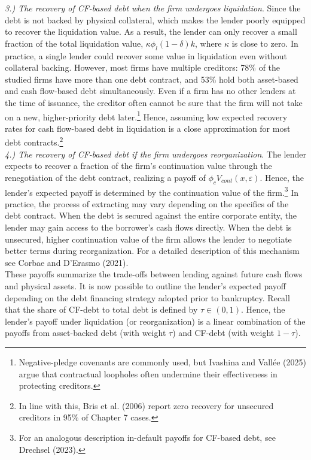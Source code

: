 \documentclass[12pt]{article}
\begin{document}
\textit{ 3.) The recovery of CF-based debt when the firm undergoes liquidation}. Since the debt is not backed by physical collateral, which makes the lender poorly equipped to recover the liquidation value. As a result, the lender can only recover a small fraction of the total liquidation value, $\kappa \phi_l(1-\delta)k$, where $\kappa$ is close to zero. In practice, a single lender could recover some value in liquidation even without collateral backing. However, most firms have multiple creditors: 78\% of the studied firms have more than one debt contract, and 53\% hold both asset-based and cash flow-based debt simultaneously. Even if a firm has no other lenders at the time of issuance, the creditor often cannot be sure that the firm will not take on a new, higher-priority debt later.\footnote{Negative-pledge covenants are commonly used, but Ivashina and Vallée (2025) argue that contractual loopholes often undermine their effectiveness in protecting creditors.} Hence, assuming low expected recovery rates for cash flow-based debt in liquidation is a close approximation for most debt contracts.\footnote{In line with this, Bris et al. (2006) report zero recovery for unsecured creditors in 95\% of Chapter 7 cases.}   \vspace{3mm} \\
\textit{ 4.) The recovery of CF-based debt if the firm undergoes reorganization}. The lender expects to recover a fraction of the firm’s continuation value through the renegotiation of the debt contract, realizing a payoff of $\phi_c V_{cont}(x,\varepsilon)$. Hence, the lender's expected payoff is determined by the continuation value of the firm.\footnote{For an analogous description in-default payoffs for CF-based debt, see Drechsel (2023).} In practice, the process of extracting may vary depending on the specifics of the debt contract. When the debt is secured against the entire corporate entity, the lender may gain access to the borrower's cash flows directly. When the debt is unsecured, higher continuation value of the firm allows the lender to negotiate better terms during reorganization. For a detailed description of this mechanism see Corbae and D'Erasmo (2021). \vspace{3mm} \\
These payoffs summarize the trade-offs between lending against future cash flows and physical assets. It is now possible to outline the lender's expected payoff depending on the debt financing strategy adopted prior to bankruptcy. Recall that the share of CF-debt to total debt is defined by $\tau \in (0,1)$. Hence, the lender's payoff under liquidation (or reorganization) is a linear combination of the payoffs from asset-backed debt (with weight $\tau$) and CF-debt (with weight $1-\tau$). 
\end{document}
